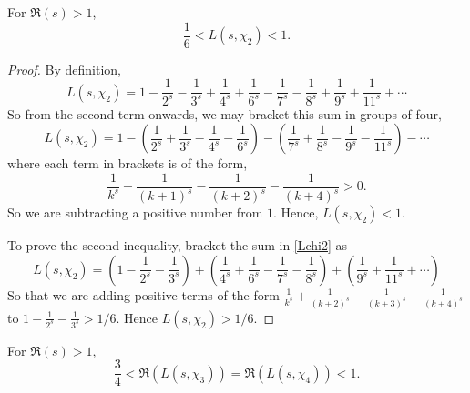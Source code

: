 \documentclass{unswmaths}
\begin{document}
    \begin{lemma}
    \label{charOrth}
        For $\Re(s) > 1$, 
        \begin{equation*}
            \frac{1}{6} < L(s,\chi_2) < 1.
        \end{equation*}
    \end{lemma}
    \begin{proof}
        By definition,
        \begin{equation}
        \label{Lchi2}
            L(s,\chi_2) = 1-\frac{1}{2^s}-\frac{1}{3^s}+\frac{1}{4^s}+\frac{1}{6^s}-\frac{1}{7^s}-\frac{1}{8^s}+\frac{1}{9^s}+\frac{1}{11^s}+\cdots
        \end{equation}
        So from the second term onwards, we may bracket this sum in groups of four,
        \begin{equation*}
            L(s,\chi_2) = 1-\left(\frac{1}{2^s}+\frac{1}{3^s}-\frac{1}{4^s}-\frac{1}{6^s}\right)-\left(\frac{1}{7^s}+\frac{1}{8^s}-\frac{1}{9^s}-\frac{1}{11^s}\right)-\cdots
        \end{equation*}
        where each term in brackets is of the form,
        \begin{equation*}
            \frac{1}{k^s}+\frac{1}{(k+1)^s}-\frac{1}{(k+2)^s}-\frac{1}{(k+4)^s} > 0.
        \end{equation*}
        So we are subtracting a positive number from $1$. Hence, $L(s,\chi_2) < 1$. 
        
        To prove the second inequality, bracket the sum in \ref{Lchi2} as
        \begin{equation*}
            L(s,\chi_2) = \left(1-\frac{1}{2^s}-\frac{1}{3^s}\right)+\left(\frac{1}{4^s}+\frac{1}{6^s}-\frac{1}{7^s}-\frac{1}{8^s}\right)+\left(\frac{1}{9^s}+\frac{1}{11^s}+\cdots\right)
        \end{equation*}
        So that we are adding positive terms of the form $\frac{1}{k^s}+\frac{1}{(k+2)^s}-\frac{1}{(k+3)^s}-\frac{1}{(k+4)^s}$ to $1-\frac{1}{2^s}-\frac{1}{3^s} > 1/6$. Hence $L(s,\chi_2) > 1/6$.
    \end{proof}
    \begin{lemma}
    \label{reBound}
        For $\Re(s) > 1$,
        \begin{equation*}
            \frac{3}{4} < \Re(L(s,\chi_3)) = \Re(L(s,\chi_4)) < 1.
        \end{equation*}
    \end{lemma}
\end{document}
